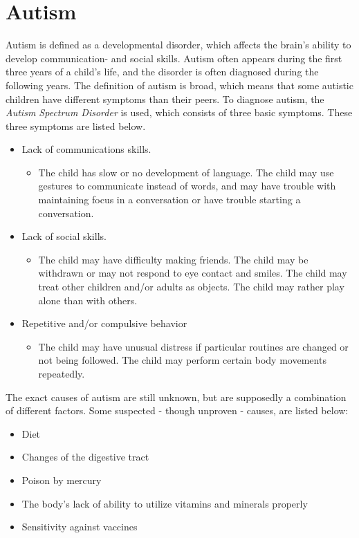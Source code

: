 \section{Autism}
Autism is defined as a developmental disorder, which affects the brain's ability to develop communication- and social skills. Autism often appears during the first three years of a child's life, and the disorder is often diagnosed during the following years. The definition of autism is broad, which means that some autistic children have different symptoms than their peers. To diagnose autism, the \emph{Autism Spectrum Disorder} is used, which consists of three basic symptoms. These three symptoms are listed below.
\begin{itemize}

  \item{Lack of communications skills.}
   \begin{itemize}
     \item{The child has slow or no development of language. The child may use gestures to communicate instead of words, and may have trouble with maintaining focus in a conversation or have trouble starting a conversation.}
   \end{itemize}
   
  \item{Lack of social skills.}
   \begin{itemize}
     \item{The child may have difficulty making friends. The child may be withdrawn or may not respond to eye contact and smiles. The child may treat other children and/or adults as objects. The child may rather play alone than with others.}
   \end{itemize}

  \item{Repetitive and/or compulsive behavior}
    \begin{itemize}
      \item{The child may have unusual distress if particular routines are changed or not being followed. The child may perform certain body movements repeatedly. \cite{autism}}
    \end{itemize}
  
\end{itemize}

The exact causes of autism are still unknown, but are supposedly a combination of different factors. Some suspected - though unproven - causes, are listed below:

\begin{itemize}
  
  \item{Diet}
  \item{Changes of the digestive tract}
  \item{Poison by mercury}
  \item{The body's lack of ability to utilize vitamins and minerals properly}
  \item{Sensitivity against vaccines\cite{autism}}
  
\end{itemize}

